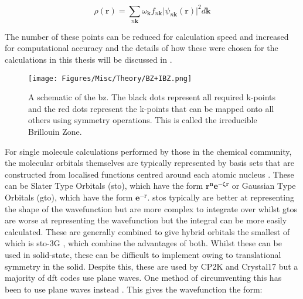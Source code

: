 \begin{equation}
\rho(\mathbf{r}) = \sum_{n\mathbf{k}} \omega_\mathbf{k} f_{n\mathbf{k}} \lvert \psi_{n\mathbf{k}}(\mathbf{r}) \rvert^2 d\mathbf{k}
\end{equation}

\DIFdelbegin {}\DIFdelend The number of these points can be reduced for calculation speed and increased for computational accuracy and the details of how these were chosen for the calculations in this thesis will be discussed in . 

\begin{figure}
    \centering
    \texttt{[image: Figures/Misc/Theory/BZ+IBZ.png]}
    \captionsetup{font = footnotesize, justification = centering}
    \caption[A Schematic of the Brillouin Zone]{A schematic of the \acrshort{bz}. The black dots represent all required k-points and the red dots represent the k-points that can be mapped onto all others using symmetry operations. This is called the irreducible Brillouin Zone.}
    \label{fig:BZIBZ}
\end{figure}

For single molecule calculations performed by those in the chemical community, the molecular orbitals themselves are typically represented by basis sets that are constructed from localised functions centred around each atomic nucleus \DIFdelbegin \DIFdel{~}\DIFdelend \cite{Huzinaga1985}. These can be Slater Type Orbitals (\acrshort{sto}), which have the form \(\boldsymbol{r^ne^{-\zeta r}}\) or Gaussian Type Orbitals (\acrshort{gto}), which have the form \(\boldsymbol{e^{-r}}\). \acrshort{sto}s typically are better at representing the shape of the wavefunction but are more complex to integrate over whilst \acrshort{gto}s are worse at representing the wavefunction but the integral can be more easily calculated. These are generally combined to give hybrid orbitals the smallest of which is \acrshort{sto}\nobreakdash-3G \DIFdelbegin \DIFdel{~}\DIFdelend \cite{Halgren1978}, which combine the advantages of both. Whilst these can be used in solid\nobreakdash-state, these can be difficult to implement owing to translational symmetry in the solid. Despite this, these are used by CP2K \DIFdelbegin \DIFdel{~}\DIFdelend \cite{Khne2020} and Crystal17 \DIFdelbegin \DIFdel{~}\DIFdelend \cite{dovesi2020crystal} but a majority of \acrshort{dft} codes use plane waves. One method of circumventing this has been to use plane waves instead \DIFdelbegin \DIFdel{~}\DIFdelend \cite{Hohenberg1964}. This gives the wavefunction the form: 

